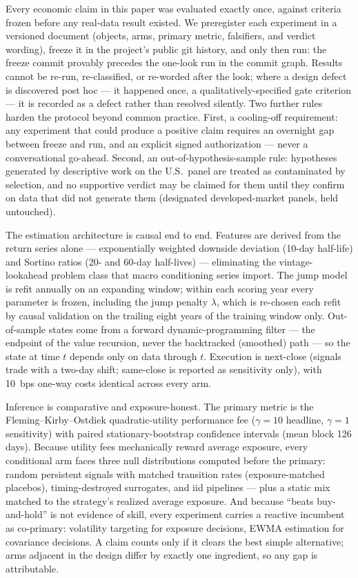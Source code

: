 \documentclass[11pt]{article}
\newcommand{\aidraft}[1]{{\color{aidraftcolor}#1}} %
\newcommand{\aidraft}[1]{#1}
\begin{document}
\aidraft{%
Every economic claim in this paper was evaluated exactly once, against criteria frozen before any
real-data result existed.
We preregister each experiment in a versioned document (objects, arms, primary metric, falsifiers,
and verdict wording), freeze it in the project's public git history, and only then run: the freeze
commit provably precedes the one-look run in the commit graph.
Results cannot be re-run, re-classified, or re-worded after the look; where a design defect is
discovered post hoc --- it happened once, a qualitatively-specified gate criterion --- it is
recorded as a defect rather than resolved silently.
Two further rules harden the protocol beyond common practice.
First, a cooling-off requirement: any experiment that could produce a positive claim requires an
overnight gap between freeze and run, and an explicit signed authorization --- never a
conversational go-ahead.
Second, an out-of-hypothesis-sample rule: hypotheses generated by descriptive work on the U.S.\
panel are treated as contaminated by selection, and no supportive verdict may be claimed for them
until they confirm on data that did not generate them (designated developed-market panels, held
untouched).%
}

\aidraft{%
The estimation architecture is causal end to end.
Features are derived from the return series alone --- exponentially weighted downside deviation
(10-day half-life) and Sortino ratios (20- and 60-day half-lives) --- eliminating the
vintage-lookahead problem class that macro conditioning series import.
The jump model is refit annually on an expanding window; within each scoring year every parameter
is frozen, including the jump penalty $\lambda$, which is re-chosen each refit by causal validation
on the trailing eight years of the training window only.
Out-of-sample states come from a forward dynamic-programming filter --- the endpoint of the value
recursion, never the backtracked (smoothed) path --- so the state at time $t$ depends only on data
through $t$.
Execution is next-close (signals trade with a two-day shift; same-close is reported as sensitivity
only), with 10~bps one-way costs identical across every arm.%
}

\aidraft{%
Inference is comparative and exposure-honest.
The primary metric is the Fleming--Kirby--Ostdiek quadratic-utility performance fee
\citep{fko2001} ($\gamma{=}10$ headline, $\gamma{=}1$ sensitivity) with paired
stationary-bootstrap confidence intervals \citep{politis1994} (mean block 126 days).
Because utility fees mechanically reward average exposure, every conditional arm faces three null
distributions computed before the primary: random persistent signals with matched transition rates
(exposure-matched placebos), timing-destroyed surrogates, and iid pipelines --- plus a static mix
matched to the strategy's realized average exposure.
And because \enquote{beats buy-and-hold} is not evidence of skill, every experiment carries a
reactive incumbent as co-primary: volatility targeting for exposure decisions, EWMA estimation for
covariance decisions.
A claim counts only if it clears the best simple alternative; arms adjacent in the design differ by
exactly one ingredient, so any gap is attributable.%
}
\end{document}
